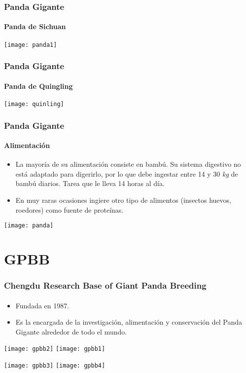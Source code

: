 \documentclass[10pt,a4paper]{beamer}
\theoremstyle{definition}
\theoremstyle{remark}
\begin{document}
\begin{frame}
\frametitle{Panda Gigante}
\framesubtitle{Panda de Sichuan }
\texttt{[image: panda1]}
\end{frame}

\begin{frame}
\frametitle{Panda Gigante}
\framesubtitle{Panda de Quingling}
\begin{center}
\texttt{[image: quinling]}
\end{center}



\end{frame}

\begin{frame}
\frametitle{Panda Gigante}
\framesubtitle{Alimentación}
\begin{itemize}
\item La mayoría de su alimentación consiste en bambú. Su sistema digestivo no está adaptado para digerirlo, por lo que debe ingestar entre 14 y 30 \textit{kg} de bambú diarios. Tarea que le lleva 14 horas al día.
\item En muy raras ocasiones ingiere otro tipo de alimentos (insectos huevos, roedores) como fuente de proteínas.
\end{itemize}
\vspace{0.2cm}
\begin{center}
\texttt{[image: panda]}
\end{center}
\end{frame}

\section{GPBB}
\begin{frame}
\frametitle{\large{Chengdu Research Base of Giant Panda Breeding}}
\framesubtitle{}
\begin{itemize}
\item Fundada en 1987.
\item Es la encargada de la investigación, alimentación y conservación del Panda Gigante alrededor de todo el mundo.
\end{itemize}
\texttt{[image: gpbb2]} \hspace{0.5cm}
\texttt{[image: gpbb1]}

\texttt{[image: gpbb3]} \hspace{0.51cm}
\texttt{[image: gpbb4]}
\end{frame}
\end{document}
